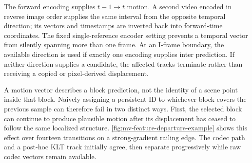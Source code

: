 The forward encoding supplies $t-1\rightarrow t$ motion. A second video encoded
in reverse image order supplies the same interval from the opposite temporal
direction; its vectors and timestamps are inverted back into forward-time
coordinates. The fixed single-reference encoder setting prevents a temporal
vector from silently spanning more than one frame. At an I-frame boundary, the
available direction is used if exactly one encoding supplies inter prediction.
If neither direction supplies a candidate, the affected tracks terminate rather
than receiving a copied or pixel-derived displacement.

A motion vector describes a block prediction, not the identity of a scene point
inside that block. Naively assigning a persistent ID to whichever block covers
the previous sample can therefore fail in two distinct ways. First,
the selected block can continue to produce plausible motion after its displacement
has ceased to follow the same localized structure. \autoref{fig:mv-feature-departure-example}
shows this effect over fourteen transitions on a strong-gradient railing edge.
The codec path and a post-hoc KLT track initially agree, then separate
progressively while raw codec vectors remain available.

